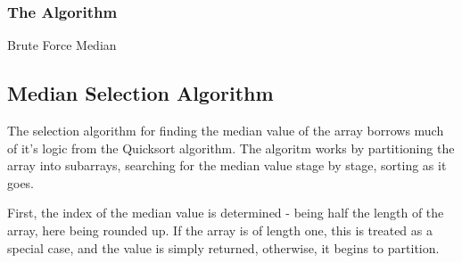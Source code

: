 \documentclass{article}
\begin{document}
        \subsubsection{The Algorithm}
            \begin{algorithm}[H]
                \caption{Brute Force Median}
                \begin{algorithmic}[1]
                                \Else
                                    \EndIf
                                \EndIf
                            \EndFor
                            \EndIf
                        \EndFor
                    \EndFunction
                \end{algorithmic}
            \end{algorithm}

    \subsection{Median Selection Algorithm}
        The selection algorithm for finding the median value of the array borrows much of it's logic from the Quicksort algorithm. The algoritm works by partitioning the array into subarrays, searching for the median value stage by stage, sorting as it goes. 

        First, the index of the median value is determined - being half the length of the array, here being rounded up. If the array is of length one, this is treated as a special case, and the value is simply returned, otherwise, it begins to partition.\\
\end{document}
